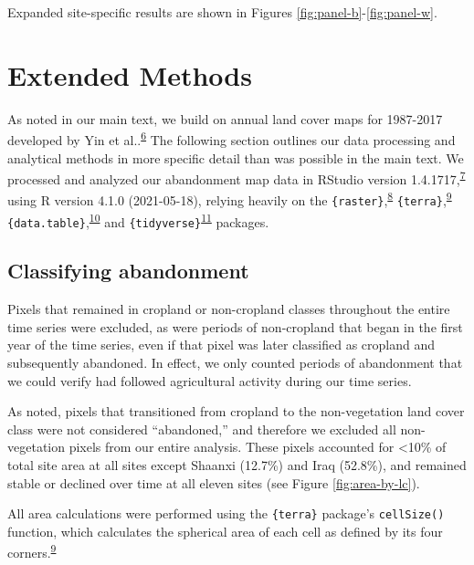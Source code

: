 \documentclass[
]{article}
\begin{document}
Expanded site-specific results are shown in Figures \ref{fig:panel-b}-\ref{fig:panel-w}.

\hypertarget{methods-si}{%
\section{Extended Methods}\label{methods-si}}

As noted in our main text, we build on annual land cover maps for 1987-2017 developed by Yin et al..\textsuperscript{\protect\hyperlink{ref-Yin2020}{6}}
The following section outlines our data processing and analytical methods in more specific detail than was possible in the main text.
We processed and analyzed our abandonment map data in RStudio version 1.4.1717,\textsuperscript{\protect\hyperlink{ref-RStudio}{7}} using R version 4.1.0 (2021-05-18), relying heavily on the \texttt{\{raster\}},\textsuperscript{\protect\hyperlink{ref-R-raster}{8}} \texttt{\{terra\}},\textsuperscript{\protect\hyperlink{ref-R-terra}{9}} \texttt{\{data.table\}},\textsuperscript{\protect\hyperlink{ref-R-data.table}{10}} and \texttt{\{tidyverse\}}\textsuperscript{\protect\hyperlink{ref-R-tidyverse}{11}} packages.

\hypertarget{classifying-abandonment}{%
\subsection{Classifying abandonment}\label{classifying-abandonment}}

Pixels that remained in cropland or non-cropland classes throughout the entire time series were excluded, as were periods of non-cropland that began in the first year of the time series, even if that pixel was later classified as cropland and subsequently abandoned.
In effect, we only counted periods of abandonment that we could verify had followed agricultural activity during our time series.

As noted, pixels that transitioned from cropland to the non-vegetation land cover class were not considered ``abandoned,'' and therefore we excluded all non-vegetation pixels from our entire analysis.
These pixels accounted for \textless10\% of total site area at all sites except Shaanxi (12.7\%) and Iraq (52.8\%), and remained stable or declined over time at all eleven sites (see Figure \ref{fig:area-by-lc}).

All area calculations were performed using the \texttt{\{terra\}} package's \texttt{cellSize()} function, which calculates the spherical area of each cell as defined by its four corners.\textsuperscript{\protect\hyperlink{ref-R-terra}{9}}
\end{document}
